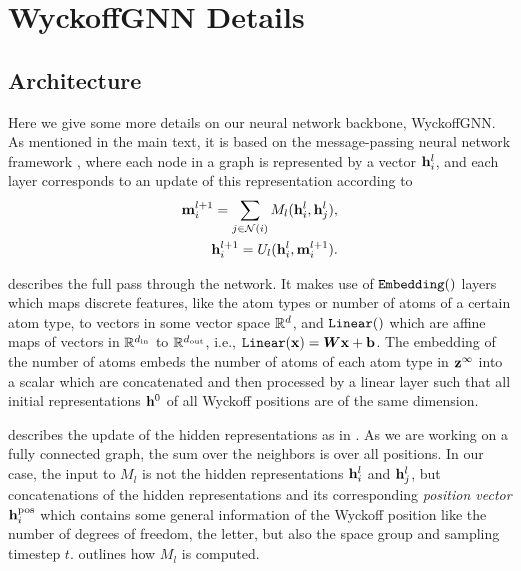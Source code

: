 \section{WyckoffGNN Details}
\label{app:gnn}
\subsection{Architecture}
Here we give some more details on our neural network backbone, WyckoffGNN. As mentioned in the main text, it is based on the message-passing neural network framework \cite{gilmer_neural_2017}, where each node in a graph is represented by a vector ${\mathbf{h}}_i^l$, and each layer corresponds to an update of this representation according to
\begin{subequations}
\label{eq:mpnn}
\begin{align}
    {\mathbf{m}}_i^{l+1} = \sum_{j\in\mathcal{N}(i)}M_l({\mathbf{h}}_i^l, {\mathbf{h}}_j^l),\\
    {\mathbf{h}}_i^{l+1} = U_l({\mathbf{h}}_i^l, {\mathbf{m}}_i^{l+1}).
\end{align}
\end{subequations}

 describes the full pass through the network. It makes use of $\Embedding$ layers which maps discrete features, like the atom types or number of atoms of a certain atom type, to vectors in some vector space $\mathbb{R}^d$, and $\Linear$ which are affine maps of vectors in $\mathbb{R}^{d_\text{in}}$ to $\mathbb{R}^{d_\text{out}}$, i.e., $\mathtt{Linear}({\mathbf{x}}) = {\bm{W}}{\mathbf{x}} + {\mathbf{b}}$. The embedding of the number of atoms embeds the number of atoms of each atom type in ${\mathbf{z}}^{\infty}$ into a scalar which are concatenated and then processed by a linear layer such that all initial representations ${\mathbf{h}}^0$ of all Wyckoff positions are of the same dimension.

 describes the update of the hidden representations as in . As we are working on a fully connected graph, the sum over the neighbors is over all positions. In our case, the input to $M_l$ is not the hidden representations ${\mathbf{h}}_i^l$ and ${\mathbf{h}}_j^l$, but concatenations of the hidden representations and its corresponding \emph{position vector} ${\mathbf{h}}_i^{\text{pos}}$ which contains some general information of the Wyckoff position like the number of degrees of freedom, the letter, but also the space group and sampling timestep $t$.  outlines how $M_l$ is computed. 





